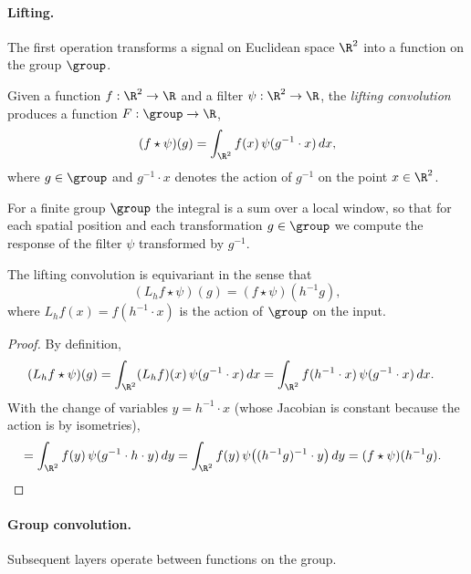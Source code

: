 \paragraph{Lifting.}
The first operation transforms a signal on Euclidean space $\R^2$ into a
function on the group $\group$.

\begin{definition}
\label{def:groups:lifting-convolution}
Given a function $f: \R^2 \to \R$ and a filter $\psi: \R^2 \to \R$, the
\emph{lifting convolution} produces a function $F: \group \to \R$,
\begin{equation}
  (f \star \psi)(g) = \int_{\R^2} f(x)\,\psi(g^{-1} \cdot x)\,dx,
  \label{eq:groups:lifting-conv}
\end{equation}
where $g \in \group$ and $g^{-1} \cdot x$ denotes the action of $g^{-1}$ on the
point $x \in \R^2$.
\end{definition}

For a finite group $\group$ the integral is a sum over a local window, so that
for each spatial position and each transformation $g \in \group$ we compute the
response of the filter $\psi$ transformed by $g^{-1}$.

\begin{theorem}
\label{thm:groups:lift-equivariance}
The lifting convolution is equivariant in the sense that
\begin{equation}
  (L_h f \star \psi)(g) = (f \star \psi)(h^{-1} g),
\end{equation}
where $L_h f(x) = f(h^{-1} \cdot x)$ is the action of $\group$ on the input.
\end{theorem}

\begin{proof}
By definition,
\begin{align}
  (L_h f \star \psi)(g)
  &= \int_{\R^2} (L_h f)(x)\,\psi(g^{-1} \cdot x)\,dx
   = \int_{\R^2} f(h^{-1} \cdot x)\,\psi(g^{-1} \cdot x)\,dx.
\end{align}
With the change of variables $y = h^{-1} \cdot x$ (whose Jacobian is constant
because the action is by isometries),
\begin{align}
  &= \int_{\R^2} f(y)\,\psi(g^{-1} \cdot h \cdot y)\,dy
   = \int_{\R^2} f(y)\,\psi\big((h^{-1} g)^{-1} \cdot y\big)\,dy
   = (f \star \psi)(h^{-1} g). \qedhere
\end{align}
\end{proof}

\paragraph{Group convolution.}
Subsequent layers operate between functions on the group.

